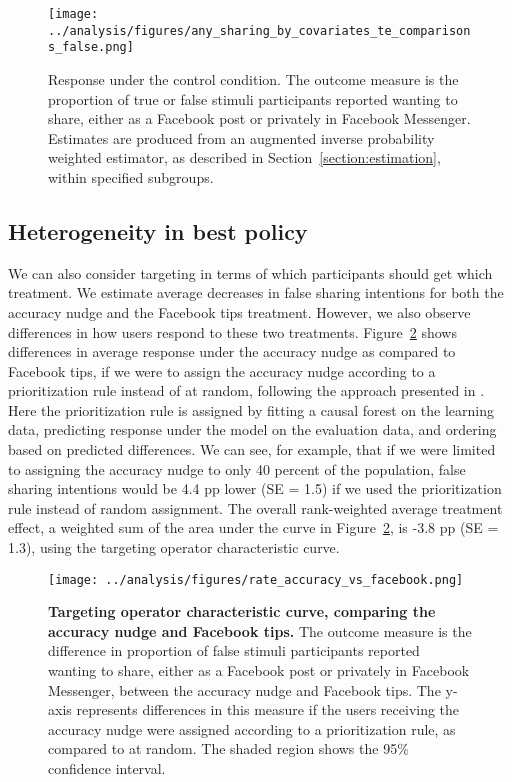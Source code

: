 \documentclass[letterpaper, 12pt, parskip=full,DIV=10]{scrartcl}
\begin{document}
\begin{figure}[H]
\texttt{[image: ../analysis/figures/any\_sharing\_by\_covariates\_te\_comparisons\_false.png]}
\caption{Response under the control condition. The outcome measure is the proportion of true or false stimuli participants reported wanting to share, either as a Facebook post or privately in Facebook Messenger. Estimates are produced from an augmented inverse probability weighted estimator, as described in Section~\ref{section:estimation}, within specified subgroups.}
\label{fig:treatments}
\end{figure}


\subsection{Heterogeneity in best policy}\label{section:het_policy}

We can also consider targeting in terms of which participants should get which treatment. We estimate average decreases in false sharing intentions for both the accuracy nudge and the Facebook tips treatment. However, we also observe differences in how users respond to these two treatments. Figure~\ref{fig:RATE} shows differences in average response under the accuracy nudge as compared to Facebook tips, if we were to assign the accuracy nudge according to a prioritization rule instead of at random, following the approach presented in \citet{yadlowsky2021evaluating}. Here the prioritization rule is assigned by fitting a causal forest on the learning data, predicting response under the model on the evaluation data, and ordering based on predicted differences. We can see, for example, that if we were limited to assigning the accuracy nudge to only 40 percent of the population, false sharing intentions would be 4.4 pp lower (SE = 1.5) if we used the prioritization rule instead of random assignment. The overall rank-weighted average treatment effect, a weighted sum of the area under the curve in Figure~\ref{fig:RATE}, is -3.8 pp (SE = 1.3), using the targeting operator characteristic curve. 

\begin{figure}[H] %
   \centering
   \texttt{[image: ../analysis/figures/rate\_accuracy\_vs\_facebook.png]} 
   \caption{\textbf{Targeting operator characteristic curve, comparing the accuracy nudge and Facebook tips.} The outcome measure is the difference in proportion of false stimuli participants reported wanting to share, either as a Facebook post or privately in Facebook Messenger, between the accuracy nudge and Facebook tips. The y-axis represents differences in this measure if the users receiving the accuracy nudge were assigned according to a prioritization rule, as compared to at random. The shaded region shows the 95\% confidence interval.}
   \label{fig:RATE}
\end{figure}
\end{document}
